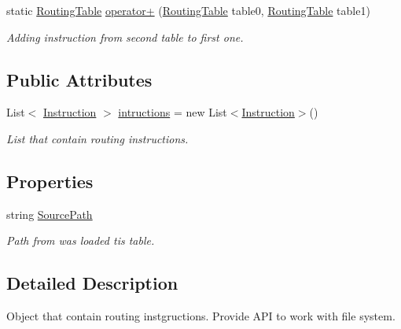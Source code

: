 \begin{DoxyCompactItemize}
static \mbox{\hyperlink{class_pipes_provider_1_1_networking_1_1_routing_1_1_routing_table}{Routing\+Table}} \mbox{\hyperlink{class_pipes_provider_1_1_networking_1_1_routing_1_1_routing_table_a515b9ad19dc868afb6d47c762064fd96}{operator+}} (\mbox{\hyperlink{class_pipes_provider_1_1_networking_1_1_routing_1_1_routing_table}{Routing\+Table}} table0, \mbox{\hyperlink{class_pipes_provider_1_1_networking_1_1_routing_1_1_routing_table}{Routing\+Table}} table1)
\begin{DoxyCompactList}\small\item\em Adding instruction from second table to first one. \end{DoxyCompactList}\end{DoxyCompactItemize}
\subsection*{Public Attributes}
\begin{DoxyCompactItemize}
\item 
List$<$ \mbox{\hyperlink{class_pipes_provider_1_1_networking_1_1_routing_1_1_instruction}{Instruction}} $>$ \mbox{\hyperlink{class_pipes_provider_1_1_networking_1_1_routing_1_1_routing_table_a1a2c8459b4805d7ee1e81698a389f3f7}{intructions}} = new List$<$\mbox{\hyperlink{class_pipes_provider_1_1_networking_1_1_routing_1_1_instruction}{Instruction}}$>$()
\begin{DoxyCompactList}\small\item\em List that contain routing instructions. \end{DoxyCompactList}\end{DoxyCompactItemize}
\subsection*{Properties}
\begin{DoxyCompactItemize}
\item 
string \mbox{\hyperlink{class_pipes_provider_1_1_networking_1_1_routing_1_1_routing_table_af756c825762d5434f5b934a1c1b2d3eb}{Source\+Path}}
\begin{DoxyCompactList}\small\item\em Path from was loaded tis table. \end{DoxyCompactList}\end{DoxyCompactItemize}


\subsection{Detailed Description}
Object that contain routing instgructions. Provide A\+PI to work with file system. 



